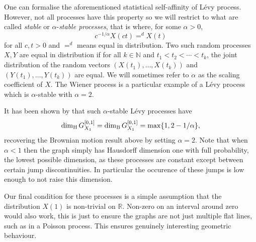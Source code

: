 One can formalise the aforementioned statistical self-affinity of L\'evy process. However, not all processes have this property so we will restrict to what are called \textit{stable} or $\alpha$-\textit{stable processes}, that is where, for some $\alpha > 0$,
\[
c^{-1/\alpha}X(ct) =^d X(t)
\]
for all $c,t > 0$ and $=^d$ means equal in distribution. Two such random processes $X,Y$ are equal in distribution if for all $k\in \mathbb{N}$ and $t_1< t_2 < \cdots < t_k$, the joint distribution of the random vectors $(X(t_1), \ldots, X(t_k))$ and $(Y(t_1),\ldots, Y(t_k))$ are equal. We will sometimes refer to $\alpha$ as the scaling coefficient of $X$. The Wiener process is a particular example of a L\'evy process which is $\alpha$-stable with $\alpha = 2$. 


It has been shown by \cite{blumenth} that such $\alpha$-stable L\'evy processes have
\[
\dim_\text{H} G_{X_1}^{[0,1]} = \dim_{\textup{B}}  G_{X_1}^{[0,1]} = \max\{1, 2 - 1/\alpha\},
\]
recovering the Brownian motion result above by setting $\alpha = 2$. Note that when $\alpha < 1$ then the graph simply has Hausdorff dimension one with full probability, the lowest possible dimension, as these processes are constant except between certain jump discontinuities. In particular the occurence of these jumps is low enough to not raise this dimension.

Our final condition for these processes is a simple assumption that the distribution $X(1)$ is non-trivial on $\mathbb{R}$. Non-zero on an interval around zero would also work, this is just to ensure the graphs are not just multiple flat lines, such as in a Poisson process. This ensures genuinely interesting geometric behaviour.

